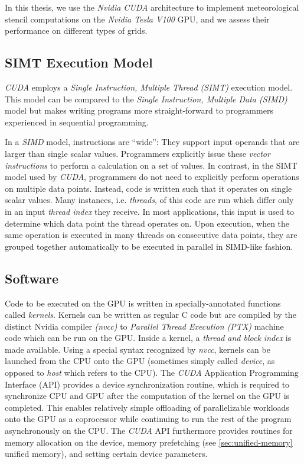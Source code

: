 In this thesis, we use the \emph{Nvidia CUDA} architecture to implement meteorological stencil computations on the \emph{Nvidia Tesla V100} GPU, and we assess their performance on different types of grids.

\subsection{SIMT Execution Model}

\emph{CUDA} employs a \emph{Single Instruction, Multiple Thread (SIMT)} execution model. This model can be compared to the \emph{Single Instruction, Multiple Data (SIMD)} model but makes writing programs more straight-forward to programmers experienced in sequential programming.\cite[Section~3.1]{ptx-isa} 

In a \emph{SIMD} model, instructions are ``wide'': They support input operands that are larger than single scalar values. Programmers explicitly issue these \emph{vector instructions} to perform a calculation on a set of values. In contrast, in the SIMT model used by \emph{CUDA}, programmers do not need to explicitly perform operations on multiple data points. Instead, code is written such that it operates on single scalar values. Many instances, i.e. \emph{threads}, of this code are run which differ only in an input \emph{thread index} they receive. In most applications, this input is used to determine which data point the thread operates on. Upon execution, when the same operation is executed in many threads on consecutive data points, they are grouped together automatically to be executed in parallel in SIMD-like fashion.

\subsection{Software}

Code to be executed on the GPU is written in specially-annotated functions called \emph{kernels}. Kernels can be written as regular C code but are compiled by the distinct Nvidia compiler \emph{(nvcc)} to \emph{Parallel Thread Execution (PTX)} machine code which can be run on the GPU. Inside a kernel, a \emph{thread and block index} is made available. Using a special syntax recognized by \emph{nvcc}, kernels can be launched from the CPU onto the GPU (sometimes simply called \emph{device}, as opposed to \emph{host} which refers to the CPU). The \emph{CUDA} Application Programming Interface (API) provides a device synchronization routine, which is required to synchronize CPU and GPU after the computation of the kernel on the GPU is completed. This enables relatively simple offloading of parallelizable workloads onto the GPU as a coprocessor while continuing to run the rest of the program asynchronously on the CPU. The \emph{CUDA} API furthermore provides routines for memory allocation on the device, memory prefetching (see \ref{sec:unified-memory} unified memory), and setting certain device parameters.

